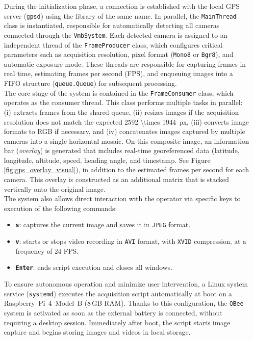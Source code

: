 \noindent During the initialization phase, a connection is established with the local GPS server (\texttt{gpsd}) using the library of the same name. In parallel, the \texttt{MainThread} class is instantiated, responsible for automatically detecting all cameras connected through the \texttt{VmbSystem}. Each detected camera is assigned to an independent thread of the \texttt{FrameProducer} class, which configures critical parameters such as acquisition resolution, pixel format (\texttt{Mono8} or \texttt{Bgr8}), and automatic exposure mode. These threads are responsible for capturing frames in real time, estimating frames per second (FPS), and enqueuing images into a FIFO structure (\texttt{queue.Queue}) for subsequent processing.\\


\noindent The core stage of the system is contained in the \texttt{FrameConsumer} class, which operates as the consumer thread. This class performs multiple tasks in parallel: (i) extracts frames from the shared queue, (ii) resizes images if the acquisition resolution does not match the expected \SI[parse-numbers = false]{2592 \times 1944}{px}, (iii) converts image formats to RGB if necessary, and (iv) concatenates images captured by multiple cameras into a single horizontal mosaic. On this composite image, an information bar (\textit{overlay}) is generated that includes real-time georeferenced data (latitude, longitude, altitude, speed, heading angle, and timestamp. See Figure \ref{fig:gps_overlay_visual}), in addition to the estimated frames per second for each camera. This overlay is constructed as an additional matrix that is stacked vertically onto the original image.\\

\noindent The system also allows direct interaction with the operator via specific keys to execution of the following commands:
\begin{itemize}
    \item \textbf{\texttt{s}}: captures the current image and saves it in \texttt{JPEG} format.
    \item \textbf{\texttt{v}}: starts or stops video recording in \texttt{AVI} format, with \texttt{XVID} compression, at a frequency of 24 FPS.
    \item \textbf{\texttt{Enter}}: ends script execution and closes all windows.
\end{itemize}

\noindent To ensure autonomous operation and minimize user intervention, a Linux system service (\texttt{systemd}) executes the acquisition script automatically at boot on a Raspberry~Pi~4~Model~B (8\,GB RAM). Thanks to this configuration, the \texttt{QBee} system is activated as soon as the external battery is connected, without requiring a desktop session. Immediately after boot, the script starts image capture and begins storing images and videos in local storage.\\

